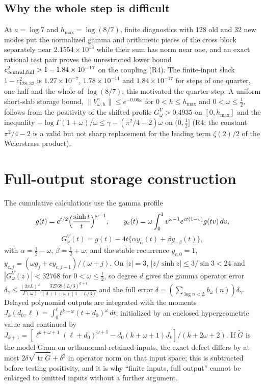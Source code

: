 \documentclass[11pt]{article}
\numberwithin{equation}{section}
\theoremstyle{definition}
\theoremstyle{remark}
\newcommand{\tr}{\operatorname{tr}}
\newcommand{\norm}[1]{\lVert#1\rVert}
\begin{document}
\subsection{Why the whole step is difficult}
At $a=\log7$ and $h_{\max}=\log(8/7)$, finite diagnostics with 128 old and 32 new modes put the normalized gamma and arithmetic pieces of the cross block separately near $2.1554\times10^{13}$ while their sum has norm near one, and an exact rational test pair proves the unrestricted lower bound $c^2_{\rm central,full}>1-1.84\times10^{-17}$ on the coupling (R4). The finite-input slack $1-c^2_{128,32}$ is $1.27\times10^{-7}$, $1.78\times10^{-11}$ and $1.84\times10^{-17}$ for steps of one quarter, one half and the whole of $\log(8/7)$; this motivated the quarter-step. A uniform short-slab storage bound, $\norm{V^\gamma_{\omega,h}}\le e^{-0.06\omega}$ for $0<h\le h_{\max}$ and $0<\omega\le\tfrac12$, follows from the positivity of the shifted profile $G^V_\omega>0.4935$ on $[0,h_{\max}]$ and the inequality $-\log\Gamma(1+\omega)/\omega\le\gamma-(\pi^2/4-2)\omega$ on $(0,\tfrac12]$ (R4; the constant $\pi^2/4-2$ is a valid but not sharp replacement for the leading term $\zeta(2)/2$ of the Weierstrass product).

\section{Full-output storage construction}\label{app:storage}
The cumulative calculations use the gamma profile
\[
 g(t)=e^{t/2}\Bigl(\frac{\sinh t}{t}\Bigr)^{\omega-1},\qquad y_c(t)=\omega\int_0^1v^{\omega-1}e^{ct(1-v)}g(tv)\,dv,
\]
\[
 G^V_\omega(t)=g(t)-4t\{\alpha y_\alpha(t)+\beta y_{-\beta}(t)\},
\]
with $\alpha=\tfrac12-\omega$, $\beta=\tfrac12+\omega$, and the stable recurrence $y_{c,0}=1$, $y_{c,j}=(\omega g_j+cy_{c,j-1})/(\omega+j)$. On $|z|=3$, $|z/\sinh z|\le3/\sin3<24$ and $|G^V_\omega(z)|<32768$ for $0<\omega\le\tfrac12$, so degree $d$ gives the gamma operator error $\delta_\gamma\le\frac{(2\pi L)^\omega}{\Gamma(\omega)}\frac{32768(L/3)^{d+1}}{(d+1+\omega)(1-L/3)}$ and the full error $\delta=(\sum_{\log n<L}b_\omega(n))\delta_\gamma$. Delayed polynomial outputs are integrated with the moments $J_k(d_0,\ell)=\int_0^\ell t^{k+\omega}(t+d_0)^\omega\,dt$, initialized by an enclosed hypergeometric value and continued by $J_{k+1}=[\ell^{k+\omega+1}(\ell+d_0)^{\omega+1}-d_0(k+\omega+1)J_k]/(k+2\omega+2)$. If $\widetilde G$ is the model Gram on orthonormal retained inputs, the exact defect differs by at most $2\delta\sqrt{\tr\widetilde G}+\delta^2$ in operator norm on that input space; this is subtracted before testing positivity, and it is why ``finite inputs, full output'' cannot be enlarged to omitted inputs without a further argument.
\end{document}
